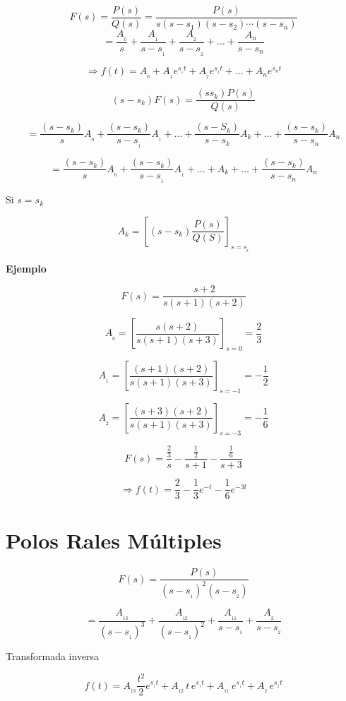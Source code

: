 $$F(s) = \dfrac{P(s)}{Q(s)} = \dfrac{P(s)}{s(s - s_{1})(s - s_{2})\cdots (s - s_{n})}$$
$$= \dfrac{A_{_0}}{s} + \dfrac{A_{_1}}{s - s_{_1}} + \dfrac{A_{_2}}{s - s_{_2}} + \ldots 
+ \dfrac{A_{n}}{s - s_{n}}$$

$$\Rightarrow f(t) = A_{_0} + A_{_1}e^{s_{_1} t} + A_{_2}e^{s_{_2} t} + \ldots + A_{n}e^{s_{n} t}$$

$$(s - s_{k})F(s) = \dfrac{(s  s_{k})P(s)}{Q(s)}$$

$$= \dfrac{(s - s_{k})}{s}A_{_0} +\dfrac{(s - s_{k})}{s - s_{_1}}A_{_1} + \ldots + \dfrac{(s - S_{k})}{s - s_{k}}A_{k} + \ldots + 
			\dfrac{(s - s_{k})}{s - s_{n}}A_{n}$$

$$= \dfrac{(s - s_{k})}{s}A_{_0} +\dfrac{(s - s_{k})}{s - s_{_1}}A_{_1} + \ldots + A_{k} + \ldots + 
\dfrac{(s - s_{k})}{s - s_{n}}A_{n}$$

Si $s = s_{k}$

$$ A_{k} = \left[ (s - s_{k}) \dfrac{P(s)}{Q(S)} \right]_{s = s_{_k}} $$

\textbf{Ejemplo}

$$F(s) = \dfrac{s + 2}{s(s + 1)(s + 2)}$$

$$A_{_0} = \left[ \dfrac{s(s + 2)}{s(s + 1)(s + 3)} \right]_{s = 0} = \dfrac{2}{3} $$

$$A_{_1} = \left[ \dfrac{(s + 1)(s + 2)}{s(s + 1)(s + 3)} \right]_{s = -1} = - \dfrac{1}{2} $$

$$A_{_2} = \left[ \dfrac{(s + 3)(s + 2)}{s(s + 1)(s + 3)} \right]_{s = -3} = - \dfrac{1}{6} $$

$$F(s) = \dfrac{\frac{2}{3}}{s} - \dfrac{\frac{1}{2}}{s + 1} - \dfrac{\frac{1}{6}}{s + 3}$$

$$\Rightarrow f(t) = \dfrac{2}{3} - \dfrac{1}{3} e^{-t} - \dfrac{1}{6} e^{-3t}$$





\section{Polos Rales Múltiples}

$$F(s) = \dfrac{P(s)}{(s - s_{_1})^2 (s - s_{_2})}$$

$$= \dfrac{A_{_{13}}}{(s - s_{_1})^3} + \dfrac{A_{_{12}}}{(s - s_{_1})^2} + \dfrac{A_{_{11}}}{s - s_{_1}} + \dfrac{A_{_2}}{s - s_{_2}}$$

Transformada inversa

$$f(t) = A_{_{13}} \dfrac{t^2}{2} e^{s_{_1} t} + A_{_{12}}\, t \, e^{s_{_1} t} + A_{_{11}}\,e^{s_{_1} t} + A_{_2}\, e^{s_{_2} t}$$

